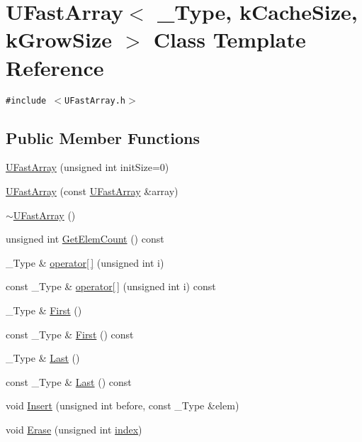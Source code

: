 \hypertarget{class_u_fast_array}{
\section{UFastArray$<$ \_\-Type, kCacheSize, kGrowSize $>$ Class Template Reference}
\label{class_u_fast_array}
}
{\tt \#include $<$UFastArray.h$>$}

\subsection*{Public Member Functions}
\begin{CompactItemize}
\item 
\hyperlink{class_u_fast_array_2310fb261513046671a265030604aaa1}{UFastArray} (unsigned int initSize=0)
\item 
\hyperlink{class_u_fast_array_c7ef0ae1aa140c21dd0461e79bdd237d}{UFastArray} (const \hyperlink{class_u_fast_array}{UFastArray} \&array)
\item 
\hyperlink{class_u_fast_array_6a643fc3aadc7114f343efdd5ddf9976}{$\sim$UFastArray} ()
\item 
unsigned int \hyperlink{class_u_fast_array_0f656de7d6eb46b1a090bd3b1c26cb35}{GetElemCount} () const 
\item 
\_\-Type \& \hyperlink{class_u_fast_array_47585b9f9bceaca22c294f2e961aa693}{operator\mbox{[}$\,$\mbox{]}} (unsigned int i)
\item 
const \_\-Type \& \hyperlink{class_u_fast_array_831daf82a5330a255728bf6236d31eb1}{operator\mbox{[}$\,$\mbox{]}} (unsigned int i) const 
\item 
\_\-Type \& \hyperlink{class_u_fast_array_63b17c1f39f318512e9f2fc73d0eabd7}{First} ()
\item 
const \_\-Type \& \hyperlink{class_u_fast_array_fc704c356efce5b8dfb26458f7fbf413}{First} () const 
\item 
\_\-Type \& \hyperlink{class_u_fast_array_6a006a084269457b6033e624999adc1c}{Last} ()
\item 
const \_\-Type \& \hyperlink{class_u_fast_array_a6ab8002f344c6faab090a89375b10f9}{Last} () const 
\item 
void \hyperlink{class_u_fast_array_ff7420c215117e8cdc91d27fd2519b13}{Insert} (unsigned int before, const \_\-Type \&elem)
\item 
void \hyperlink{class_u_fast_array_eef6f5a281cb95cf277c33714117ab05}{Erase} (unsigned int \hyperlink{glext__bak_8h_57f14e05b1900f16a2da82ade47d0c6d}{index})
\item 

\end{CompactItemize}
